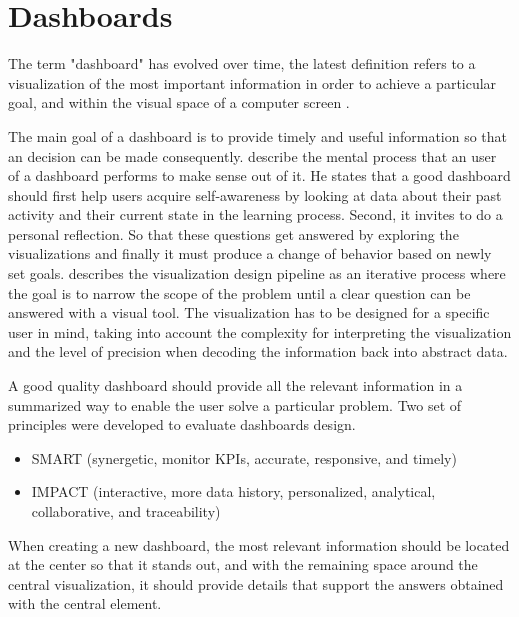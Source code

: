 \chapter{Dashboards}

The term "dashboard" has evolved over time, the latest definition refers to a visualization of the most important information in order to achieve a particular goal, and within the visual space of a computer screen \cite{Park2015}.

The main goal of a dashboard is to provide timely and useful information so that an decision can be made consequently. \citeauthor{Verbert2013} describe the mental process that an user of a dashboard performs to make sense out of it. He states that a good dashboard should first help users acquire self-awareness by looking at data about their past activity and their current state in the learning process. Second, it invites to do a personal reflection. So that these questions get answered by exploring the visualizations and finally it must produce a change of behavior based on newly set goals. \citeauthor{Telea2017} describes the visualization design pipeline as an iterative process where the goal is to narrow the scope of the problem until a clear question can be answered with a visual tool. The visualization has to be designed for a specific user in mind, taking into account the complexity for interpreting the visualization and the level of precision when decoding the information back into abstract data.

A good quality dashboard should provide all the relevant information in a summarized way to enable the user solve a particular problem. Two set of principles were developed to evaluate dashboards design. 
\begin{itemize}
	\item SMART (synergetic, monitor KPIs, accurate, responsive,
	and timely)
	\item IMPACT (interactive, more data history, personalized, analytical, collaborative, and traceability) \cite{Malik2005}\\
	
\end{itemize}

When creating a new dashboard, the most relevant information should be located at the center so that it stands out, and with the remaining space around the central visualization, it should provide details that support the answers obtained with the central element.

